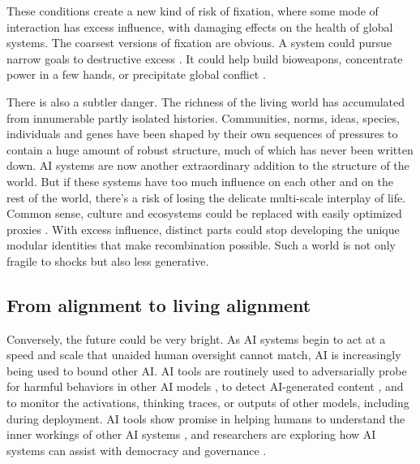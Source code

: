 \documentclass[11pt]{article}
\begin{document}
These conditions create a new kind of risk of fixation, where some mode of interaction has excess influence, with damaging effects on the health of global systems. The coarsest versions of fixation are obvious. A system could pursue narrow goals to destructive excess \citep{bostrom2014superintelligence}. It could help build bioweapons, concentrate power in a few hands, or precipitate global conflict \citep{amodei2026adolescence}. 

There is also a subtler danger. The richness of the living world has accumulated from innumerable partly isolated histories. Communities, norms, ideas, species, individuals and genes have been shaped by their own sequences of pressures to contain a huge amount of robust structure, much of which has never been written down. AI systems are now another extraordinary addition to the structure of the world. But if these systems have too much influence on each other and on the rest of the world, there's a risk of losing the delicate multi-scale interplay of life. Common sense, culture and ecosystems could be replaced with easily optimized proxies \citep{christiano2019failure}. With excess influence, distinct parts could stop developing the unique modular identities that make recombination possible. Such a world is not only fragile to shocks but also less generative.









\subsection*{From alignment to living alignment}

Conversely, the future could be very bright. As AI systems begin to act at a speed and scale that unaided human oversight cannot match, AI is increasingly being used to bound other AI. AI tools are routinely used to adversarially probe for harmful behaviors in other AI models \citep{perez2022red}, to detect AI-generated content \citep{rossler2019faceforensics}, and to monitor the activations, thinking traces, or outputs of other models, including during deployment. AI tools show promise in helping humans to understand the inner workings of other AI systems \citep{bills2023language}, and researchers are exploring how AI systems can assist with democracy and governance \citep{tessler2024ai, zheng2022ai}.
\end{document}
